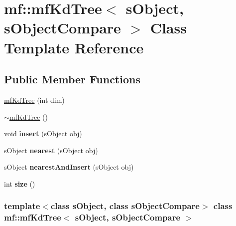 \hypertarget{classmf_1_1mfKdTree}{
\section{mf::mfKdTree$<$ sObject, sObjectCompare $>$ Class Template Reference}
\label{classmf_1_1mfKdTree}
}
\subsection*{Public Member Functions}
\begin{DoxyCompactItemize}
\item 
\hyperlink{classmf_1_1mfKdTree_a0b1cf7f08b3021060bfbec20a48b9b3b}{mfKdTree} (int dim)
\item 
\hyperlink{classmf_1_1mfKdTree_a237a36fe0226ed522ddfc5d4a7f3a8b8}{$\sim$mfKdTree} ()
\item 
\hypertarget{classmf_1_1mfKdTree_abea779a2059a7c535a89fc7e4baef307}{
void {\bfseries insert} (sObject obj)}
\label{classmf_1_1mfKdTree_abea779a2059a7c535a89fc7e4baef307}

\item 
\hypertarget{classmf_1_1mfKdTree_afa8778cfee34a06d8b9b2ba2ceb31cb0}{
sObject {\bfseries nearest} (sObject obj)}
\label{classmf_1_1mfKdTree_afa8778cfee34a06d8b9b2ba2ceb31cb0}

\item 
\hypertarget{classmf_1_1mfKdTree_a6cbc124706ac07e2d5562ad6bf7f7d3b}{
sObject {\bfseries nearestAndInsert} (sObject obj)}
\label{classmf_1_1mfKdTree_a6cbc124706ac07e2d5562ad6bf7f7d3b}

\item 
\hypertarget{classmf_1_1mfKdTree_aede67ecedd3fad76b47d5d988e667b41}{
int {\bfseries size} ()}
\label{classmf_1_1mfKdTree_aede67ecedd3fad76b47d5d988e667b41}

\end{DoxyCompactItemize}
\subsubsection*{template$<$class sObject, class sObjectCompare$>$ class mf::mfKdTree$<$ sObject, sObjectCompare $>$}



